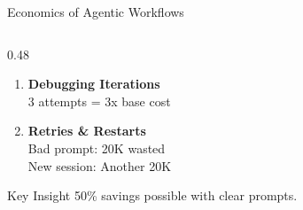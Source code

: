 \documentclass[aspectratio=169,11pt]{beamer}
\begin{document}
\begin{frame}{Economics of Agentic Workflows}
\begin{columns}[T]
\begin{column}{0.48\textwidth}
\begin{enumerate}
                \item \textbf{Debugging Iterations}\\
                3 attempts = 3x base cost

                \item \textbf{Retries \& Restarts}\\
                Bad prompt: 20K wasted\\
                New session: Another 20K
            \end{enumerate}

            \begin{alertblock}{Key Insight}
                50\% savings possible with clear prompts.
            \end{alertblock}
        \end{column}
    \end{columns}
\end{frame}
\end{document}

